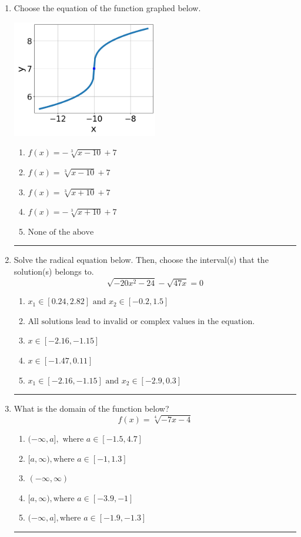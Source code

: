 \documentclass[14pt]{extbook}
\newcommand{\litem}[1]{\item#1\hspace*{-1cm}\rule{\textwidth}{0.4pt}}
\begin{document}
\begin{enumerate}
\litem{
Choose the equation of the function graphed below.
\begin{center}
    \includegraphics[width=0.5\textwidth]{../Figures/radicalGraphToEquationC.png}
\end{center}
\begin{enumerate}[label=\Alph*.]
\item \( f(x) = - \sqrt[3]{x - 10} + 7 \)
\item \( f(x) = \sqrt[3]{x - 10} + 7 \)
\item \( f(x) = \sqrt[3]{x + 10} + 7 \)
\item \( f(x) = - \sqrt[3]{x + 10} + 7 \)
\item \( \text{None of the above} \)

\end{enumerate} }
\litem{
Solve the radical equation below. Then, choose the interval(s) that the solution(s) belongs to.\[ \sqrt{-20 x^2 - 24} - \sqrt{47 x} = 0 \]\begin{enumerate}[label=\Alph*.]
\item \( x_1 \in [0.24, 2.82] \text{ and } x_2 \in [-0.2,1.5] \)
\item \( \text{All solutions lead to invalid or complex values in the equation.} \)
\item \( x \in [-2.16,-1.15] \)
\item \( x \in [-1.47,0.11] \)
\item \( x_1 \in [-2.16, -1.15] \text{ and } x_2 \in [-2.9,0.3] \)

\end{enumerate} }
\litem{
What is the domain of the function below?\[ f(x) = \sqrt[4]{-7 x - 4} \]\begin{enumerate}[label=\Alph*.]
\item \( (-\infty, a], \text{ where } a \in [-1.5, 4.7] \)
\item \( [a, \infty), \text{where } a \in [-1, 1.3] \)
\item \( (-\infty, \infty) \)
\item \( [a, \infty), \text{where } a \in [-3.9, -1] \)
\item \( (-\infty, a], \text{where } a \in [-1.9, -1.3] \)


\end{enumerate}}
\end{enumerate}
\end{document}
